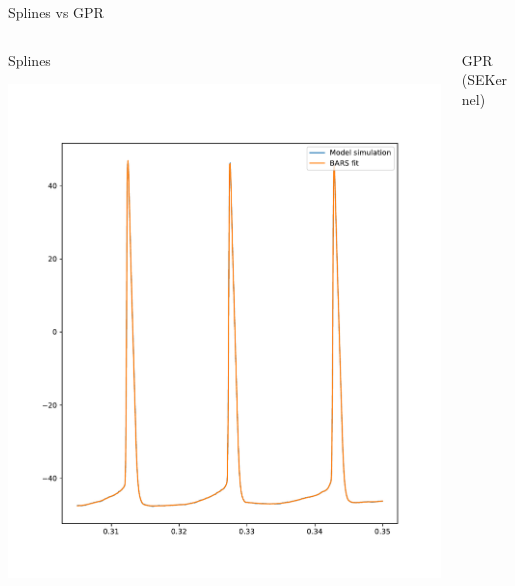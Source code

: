 \documentclass[presentation]{beamer}
\begin{document}
\begin{frame}[plain,label={sec:org57a8d4d}]{Splines vs GPR}
\begin{columns}
\begin{column}{0.5\columnwidth}
\begin{center}
Splines
\end{center}

\begin{center}
\includegraphics[width=1.1\textwidth]{./BARS.pdf}
\end{center}
\end{column}



\begin{column}{0.5\columnwidth}
\begin{center}
GPR (SEKernel)
\end{center}


\end{column}
\end{columns}
\end{frame}
\end{document}

